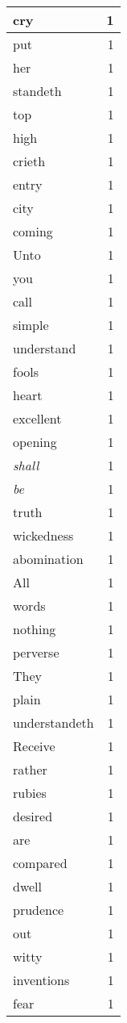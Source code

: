 \begin{center}
\begin{longtable}{l|r}
cry & 1\\ \hline 
put & 1\\ \hline 
her & 1\\ \hline 
standeth & 1\\ \hline 
top & 1\\ \hline 
high & 1\\ \hline 
crieth & 1\\ \hline 
entry & 1\\ \hline 
city & 1\\ \hline 
coming & 1\\ \hline 
Unto & 1\\ \hline 
you & 1\\ \hline 
call & 1\\ \hline 
simple & 1\\ \hline 
understand & 1\\ \hline 
fools & 1\\ \hline 
heart & 1\\ \hline 
excellent & 1\\ \hline 
opening & 1\\ \hline 
\emph{shall} & 1\\ \hline 
\emph{be} & 1\\ \hline 
truth & 1\\ \hline 
wickedness & 1\\ \hline 
abomination & 1\\ \hline 
All & 1\\ \hline 
words & 1\\ \hline 
nothing & 1\\ \hline 
perverse & 1\\ \hline 
They & 1\\ \hline 
plain & 1\\ \hline 
understandeth & 1\\ \hline 
Receive & 1\\ \hline 
rather & 1\\ \hline 
rubies & 1\\ \hline 
desired & 1\\ \hline 
are & 1\\ \hline 
compared & 1\\ \hline 
dwell & 1\\ \hline 
prudence & 1\\ \hline 
out & 1\\ \hline 
witty & 1\\ \hline 
inventions & 1\\ \hline 
fear & 1\\ \hline 

\end{longtable}
\end{center}
